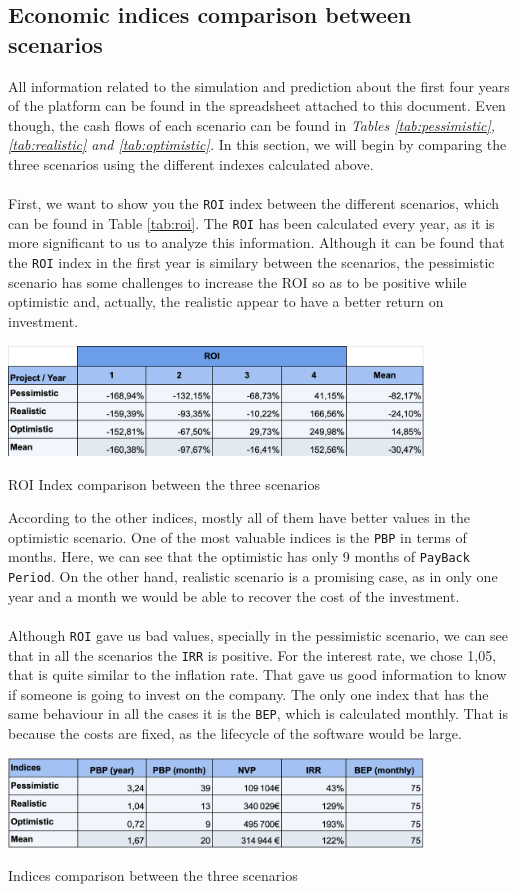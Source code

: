 \documentclass[./main.tex]{subfiles}
\begin{document}
\subsection{Economic indices comparison between scenarios}
All information related to the simulation and prediction about the first four years of the platform can be found in the spreadsheet attached to this document. Even though, the cash flows of each scenario can be found in \textit{Tables \ref{tab:pessimistic}, \ref{tab:realistic} and \ref{tab:optimistic}.}
In this section, we will begin by comparing the three scenarios using the different indexes calculated above. \\
\\
First, we want to show you the \texttt{ROI} index between the different scenarios, which can be found in Table \ref{tab:roi}. The \texttt{ROI} has been calculated every year, as it is more significant to us to analyze this information. Although it can be found that the \texttt{ROI} index in the first year is similary between the scenarios, the pessimistic scenario has some challenges to increase the ROI so as to be positive while optimistic and, actually, the realistic appear to have a better return on investment.
\begin{table}[H]
	\centering
	\includegraphics[width=11cm]{roi2.png}
	\caption{ROI Index comparison between the three scenarios}
	\label{tab:roi}
\end{table}
According to the other indices, mostly all of them have better values in the optimistic scenario. One of the most valuable indices is the \texttt{PBP} in terms of months. Here, we can see that the optimistic has only 9 months of \texttt{PayBack Period}. On the other hand, realistic scenario is a promising case, as in only one year and a month we would be able to recover the cost of the investment.
\\
\\
Although \texttt{ROI} gave us bad values, specially in the pessimistic scenario, we can see that in all the scenarios the \texttt{IRR} is positive. For the interest rate, we chose 1,05, that is quite similar to the inflation rate. That gave us good information to know if someone is going to invest on the company. The only one index that has the same behaviour in all the cases it is the \texttt{BEP}, which is calculated monthly. That is because the costs are fixed, as the lifecycle of the software would be large.
\begin{table}[H]
	\centering
	\includegraphics[width=11cm]{indices2.png}
	\caption{Indices comparison between the three scenarios}
	\label{tab:indicies}
\end{table}
\end{document}
